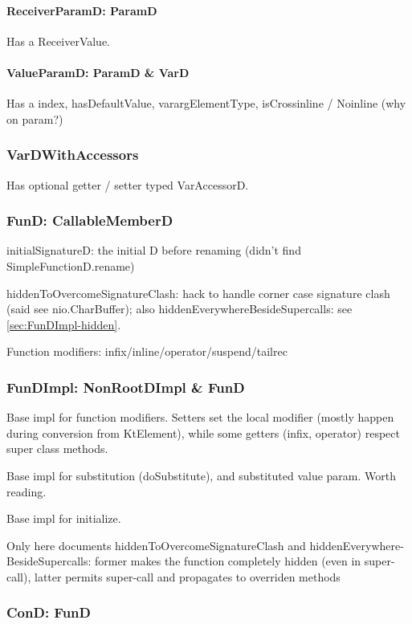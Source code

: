 \documentclass{article}
\begin{document}
\paragraph{ReceiverParamD: ParamD}
Has a ReceiverValue.

\paragraph{ValueParamD: ParamD \& VarD}
\label{sec:ValueParamD}
Has a index, hasDefaultValue, varargElementType, isCrossinline / Noinline (why on param?)

\subsubsection{VarDWithAccessors}

Has optional getter / setter typed VarAccessorD.

\subsubsection{FunD: CallableMemberD}

initialSignatureD: the initial D before renaming (didn't find SimpleFunctionD.rename)

hiddenToOvercomeSignatureClash: hack to handle corner case signature clash (said see nio.CharBuffer); also hiddenEverywhereBesideSupercalls: see \ref{sec:FunDImpl-hidden}.

Function modifiers: infix/inline/operator/suspend/tailrec

\subsubsection{FunDImpl: NonRootDImpl \& FunD}

Base impl for function modifiers. Setters set the local modifier (mostly happen during conversion from KtElement), while some getters (infix, operator) respect super class methods.

Base impl for substitution (doSubstitute), and substituted value param. Worth reading.

Base impl for initialize.

\label{sec:FunDImpl-hidden}
Only here documents hiddenToOvercomeSignatureClash and hiddenEverywhere-BesideSupercalls: former makes the function completely hidden (even in super-call), latter permits super-call and propagates to overriden methods

\subsubsection{ConD: FunD}
\end{document}
